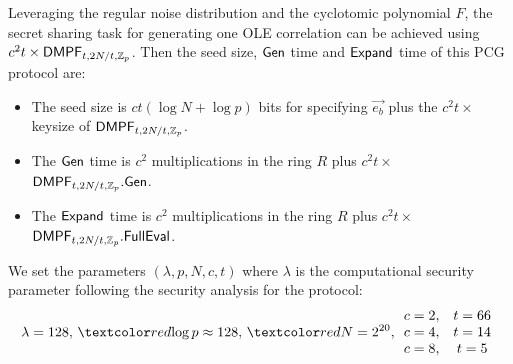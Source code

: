 Leveraging the regular noise distribution and the cyclotomic polynomial $F$, the secret sharing task for generating one OLE correlation can be achieved using $c^2t\times {\sf DMPF}_{t,2N/t, \mathbb{Z}_p}$. Then the seed size, ${\sf Gen}$ time and ${\sf Expand}$ time of this PCG protocol are: 
\begin{itemize}
    \item The seed size is $ct(\log N+\log p)$ bits for specifying $\vec{e_b}$ plus the $c^2t\times $ keysize of ${\sf DMPF}_{t,2N/t, \mathbb{Z}_p}$. 
    \item The ${\sf Gen}$ time is $c^2$ multiplications in the ring $R$ plus $c^2t\times$ ${\sf DMPF}_{t,2N/t, \mathbb{Z}_p}.{\sf Gen}$. 
    \item The ${\sf Expand}$ time is $c^2$ multiplications in the ring $R$ plus $c^2t\times$ ${\sf DMPF}_{t,2N/t, \mathbb{Z}_p}.{\sf FullEval}$. 
\end{itemize}

We set the parameters $(\lambda,p,N,c,t)$ where $\lambda$ is the computational security parameter following the security analysis for the protocol: 
\[
\lambda = 128,\,\red{\log p \approx 128},\, \red{N = 2^{20}}, \begin{array}{cc}
    c=2, & t=66 \\
    c=4, & t=14\\
    c=8, & t=5
\end{array}
\]

